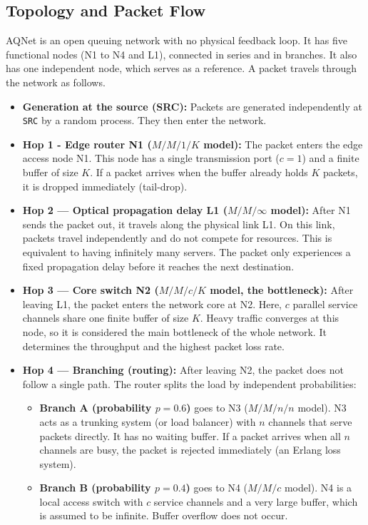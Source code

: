 \subsection{Topology and Packet Flow}
AQNet is an open queuing network with no physical feedback loop. It has five functional nodes (N1 to N4 and L1), connected in series and in branches. It also has one independent node, which serves as a reference. A packet travels through the network as follows.
\begin{itemize}
    \item \textbf{Generation at the source (SRC):} Packets are generated independently at \texttt{SRC} by a random process. They then enter the network.
    \item \textbf{Hop 1 - Edge router N1 ($M/M/1/K$ model):} The packet enters the edge access node N1. This node has a single transmission port ($c=1$) and a finite buffer of size $K$. If a packet arrives when the buffer already holds $K$ packets, it is dropped immediately (tail-drop).
    \item \textbf{Hop 2 --- Optical propagation delay L1 ($M/M/\infty$ model):} After N1 sends the packet out, it travels along the physical link L1. On this link, packets travel independently and do not compete for resources. This is equivalent to having infinitely many servers. The packet only experiences a fixed propagation delay before it reaches the next destination.
    \item \textbf{Hop 3 --- Core switch N2 ($M/M/c/K$ model, the bottleneck):} After leaving L1, the packet enters the network core at N2. Here, $c$ parallel service channels share one finite buffer of size $K$. Heavy traffic converges at this node, so it is considered the main bottleneck of the whole network. It determines the throughput and the highest packet loss rate.
    \item \textbf{Hop 4 --- Branching (routing):} After leaving N2, the packet does not follow a single path. The router splits the load by independent probabilities:
    \begin{itemize}
        \item \textbf{Branch A (probability $p = 0.6$)} goes to N3 ($M/M/n/n$ model). N3 acts as a trunking system (or load balancer) with $n$ channels that serve packets directly. It has no waiting buffer. If a packet arrives when all $n$ channels are busy, the packet is rejected immediately (an Erlang loss system).
        \item \textbf{Branch B (probability $p = 0.4$)} goes to N4 ($M/M/c$ model). N4 is a local access switch with $c$ service channels and a very large buffer, which is assumed to be infinite. Buffer overflow does not occur.

\end{itemize}
\end{itemize}
